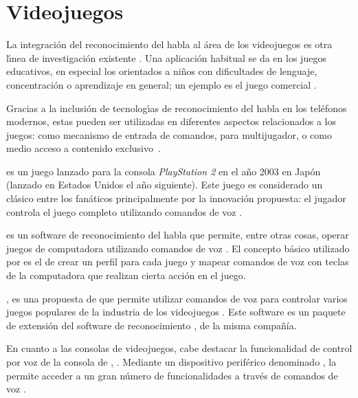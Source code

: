 \section{Videojuegos}
\label{sec:videojuegos}

La integraci\'on del reconocimiento del habla al \'area de los videojuegos es otra l{\'\i}nea de
investigaci\'on existente \cite{SporkaNonSpeech2006, JanickiAutomatic2011}. 
Una aplicaci\'on habitual se da en los juegos educativos, en especial los orientados a ni\~nos 
con dificultades de lenguaje, concentraci\'on o aprendizaje en general; un ejemplo es el juego
comercial  \cite{SayNPlay}.

Gracias a la inclusi\'on de tecnolog{\'\i}as de reconocimiento del habla en los tel\'efonos modernos,
estas pueden ser utilizadas en diferentes aspectos relacionados a los juegos: como mecanismo de entrada 
de comandos, para  multijugador, o como medio acceso a contenido 
\mbox{exclusivo \cite{JoselliMobile2009}}.

 es un juego lanzado para la consola \emph{PlayStation 2} en el a\~no 2003 en Jap\'on (lanzado en Estados Unidos
el a\~no siguiente). Este
juego es considerado un cl\'asico entre los fan\'aticos principalmente por la innovaci\'on propuesta: el jugador controla 
el juego completo utilizando comandos de voz \cite{Lifeline}.

 es un software de reconocimiento del habla que permite, entre otras cosas, operar juegos de computadora
utilizando comandos de voz \cite{tazti}. El concepto b\'asico utilizado por  es el de crear un perfil para
cada juego y mapear comandos de voz con teclas de la computadora que realizan cierta acci\'on en el juego.

, es una propuesta de  que permite utilizar
comandos de voz para controlar varios juegos populares de la industria de los videojuegos 
\cite{DragonGamingSpeech}. Este software es un paquete de extensi\'on del software de reconocimiento 
, de la misma compa\~n\'ia.

En cuanto a las consolas de videojuegos, cabe destacar la funcionalidad de control por voz de la consola
de , . Mediante un dispositivo perif\'erico denominado 
, la  permite acceder a un gran n\'umero de funcionalidades 
a trav\'es de comandos de voz \cite{KinectVoice}.